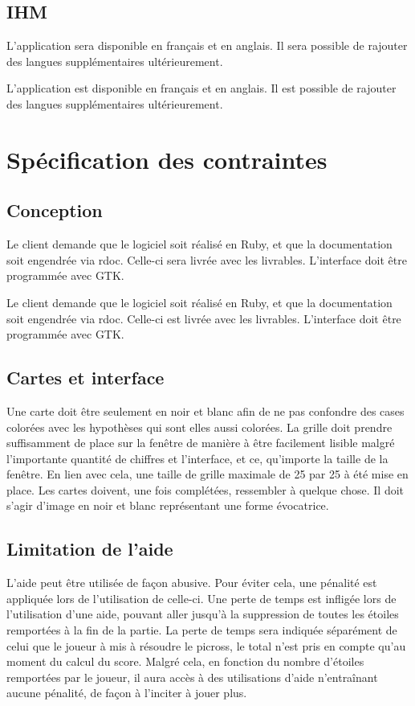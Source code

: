 \documentclass{report}
\begin{document}
			
		\section{IHM}
			L'application sera disponible en français et en anglais. Il sera possible de rajouter des langues supplémentaires ultérieurement.

			L'application est disponible en français et en anglais. Il est possible de rajouter des langues supplémentaires ultérieurement.
			
\chapter{Spécification des contraintes}

	\section{Conception}
		Le client demande que le logiciel soit réalisé en Ruby, et que la documentation soit engendrée via rdoc. Celle-ci sera livrée avec les livrables. L'interface doit être programmée avec GTK.

		Le client demande que le logiciel soit réalisé en Ruby, et que la documentation soit engendrée via rdoc. Celle-ci est livrée avec les livrables. L'interface doit être programmée avec GTK.
		
	\section{Cartes et interface}
		Une carte doit être seulement en noir et blanc afin de ne pas confondre des cases colorées avec les hypothèses qui sont elles aussi colorées.
		La grille doit prendre suffisamment de place sur la fenêtre de manière à être facilement lisible malgré l'importante quantité de chiffres et l'interface, et ce, qu'importe la taille de la fenêtre. En lien avec cela, une taille de grille maximale de 25 par 25 à été mise en place.
		Les cartes doivent, une fois complétées, ressembler à quelque chose. Il doit s'agir d'image en noir et blanc représentant une forme évocatrice.
	
	\section{Limitation de l'aide}
		L'aide peut être utilisée de façon abusive. Pour éviter cela, une pénalité est appliquée lors de l'utilisation de celle-ci. Une perte de temps est infligée lors de l'utilisation d'une aide, pouvant aller jusqu'à la suppression de toutes les étoiles remportées à la fin de la partie. La perte de temps sera indiquée séparément de celui que le joueur à mis à résoudre le picross, le total n'est pris en compte qu'au moment du calcul du score. Malgré cela, en fonction du nombre d'étoiles remportées par le joueur, il aura accès à des utilisations d'aide n'entraînant aucune pénalité, de façon à l'inciter à jouer plus.
\end{document}
